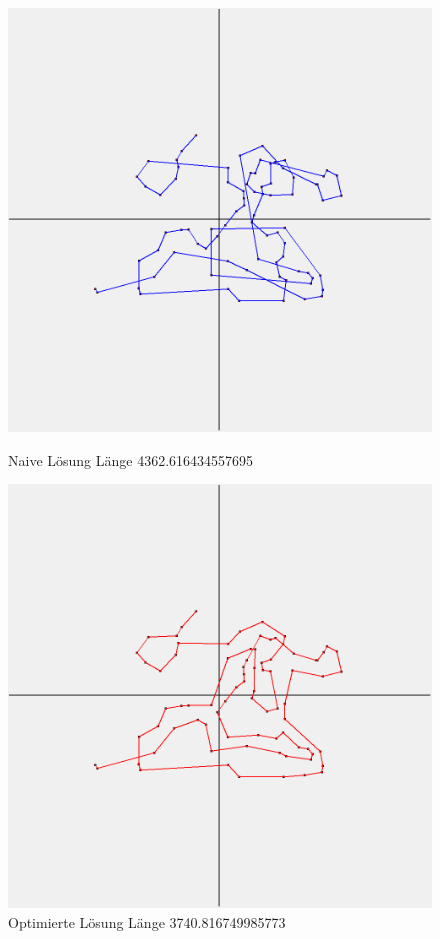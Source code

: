 \begin{figure}[t]
    \centering
    \begin{minipage}[b]{0.6\textwidth}
        \includegraphics[width=\textwidth]{naivwenigerkrumm6}
        \caption{Naive Lösung Länge 4362.616434557695}
    \end{minipage}
    \hfill
    \begin{minipage}[b]{0.6\textwidth}
        \includegraphics[width=\textwidth]{optimizedwenigerkrumm6}
        \caption{Optimierte Lösung Länge 3740.816749985773}
    \end{minipage}\label{fig:wenigerkrumm6}
\end{figure}

